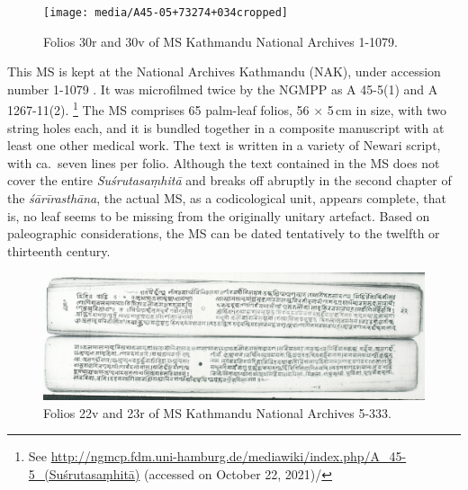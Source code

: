 \begin{description}
\begin{figure}[t]
    \centering
    \texttt{[image: media/A45-05+73274+034cropped]}
    \caption{Folios 30r and 30v of MS Kathmandu National Archives 1-1079.}
    \label{fig:a45-0573274044}
\end{figure}

\item[Siglum N (Fig.\,\ref{fig:a45-0573274044})] This MS is kept at the National Archives 
Kathmandu (NAK), under accession number 1-1079 . It was microfilmed twice by the 
NGMPP as A 45-5(1) and A 1267-11(2).%
    \footnote{%
See 
\url{http://ngmcp.fdm.uni-hamburg.de/mediawiki/index.php/A_45-5_(Suśrutasaṃhitā)}
 (accessed on October 22, 2021)/
    } 
The MS comprises 65 palm-leaf folios, 56 $\times$ 5\,cm in size, with two string holes each, 
and it is bundled together in a composite manuscript with at least one other medical work. 
The text is written in a variety of Newari script, with ca.\ seven lines per folio. Although the 
text contained in the MS does not cover the entire \emph{Suśrutasaṃhitā} and breaks off 
abruptly in the second chapter of the \emph{śārīrasthāna}, the actual MS, as a codicological 
unit, appears complete, that is, no leaf seems to be missing from the originally unitary 
artefact. Based on paleographic considerations, the MS can be dated tentatively to the twelfth 
or thirteenth century.

\begin{figure}[t]
    \centering
    \includegraphics[width=1\linewidth]{"media/dscn2998 fol 022cropped"}
    \caption{Folios 22v and 23r of MS Kathmandu National Archives 5-333.}
    \label{fig:dscn2998-fol-022cropped}
\end{figure}


\end{description}
